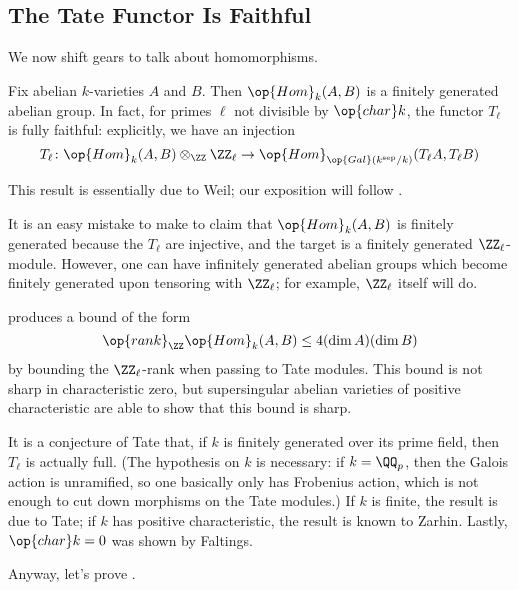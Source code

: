 \documentclass[../notes.tex]{subfiles}
\begin{document}
\subsection{The Tate Functor Is Faithful}
We now shift gears to talk about homomorphisms.
\begin{theorem} \label{thm:tate-mod-faithful}
	Fix abelian $k$-varieties $A$ and $B$. Then $\op{Hom}_k(A,B)$ is a finitely generated abelian group. In fact, for primes $\ell$ not divisible by $\op{char}k$, the functor $T_\ell$ is fully faithful: explicitly, we have an injection
	\[T_\ell\colon\op{Hom}_k(A,B)\otimes_\ZZ\ZZ_\ell\to\op{Hom}_{\op{Gal}(k^\mathrm{sep}/k)}(T_\ell A,T_\ell B)\]
\end{theorem}
This result is essentially due to Weil; our exposition will follow \cite[Theorem~IV.19.3]{mumford}.
\begin{remark}
	It is an easy mistake to make to claim that $\op{Hom}_k(A,B)$ is finitely generated because the $T_\ell$ are injective, and the target is a finitely generated $\ZZ_\ell$-module. However, one can have infinitely generated abelian groups which become finitely generated upon tensoring with $\ZZ_\ell$; for example, $\ZZ_\ell$ itself will do.
\end{remark}
\begin{remark}
	 produces a bound of the form
	\[\op{rank}_\ZZ\op{Hom}_k(A,B)\le4(\dim A)(\dim B)\]
	by bounding the $\ZZ_\ell$-rank when passing to Tate modules. This bound is not sharp in characteristic zero, but supersingular abelian varieties of positive characteristic are able to show that this bound is sharp.
\end{remark}
\begin{remark}
	It is a conjecture of Tate that, if $k$ is finitely generated over its prime field, then $T_\ell$ is actually full. (The hypothesis on $k$ is necessary: if $k=\QQ_p$, then the Galois action is unramified, so one basically only has Frobenius action, which is not enough to cut down morphisms on the Tate modules.) If $k$ is finite, the result is due to Tate; if $k$ has positive characteristic, the result is known to Zarhin. Lastly, $\op{char}k=0$ was shown by Faltings.
\end{remark}
Anyway, let's prove .
\end{document}
